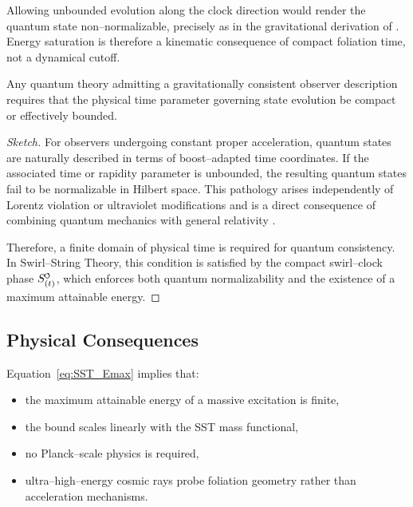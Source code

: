 \documentclass[11pt]{article}
\newcommand{\SwirlClock}{S_{(t)}^{\mkern-2mu\scriptscriptstyle\boldsymbol{\circlearrowleft}}}
\begin{document}
            Allowing unbounded evolution along the clock direction would render the quantum
            state non--normalizable, precisely as in the gravitational derivation of
            \cite{Makela2024QuantumGravity}. Energy saturation is therefore a kinematic
            consequence of compact foliation time, not a dynamical cutoff.

            \begin{theorem}
                \label{thm:time_boundedness}

                Any quantum theory admitting a gravitationally consistent observer description
                requires that the physical time parameter governing state evolution be compact
                or effectively bounded.

            \end{theorem}

            \begin{proof}[Sketch]
                For observers undergoing constant proper acceleration, quantum states are
                naturally described in terms of boost--adapted time coordinates.
                If the associated time or rapidity parameter is unbounded, the resulting
                quantum states fail to be normalizable in Hilbert space.
                This pathology arises independently of Lorentz violation or ultraviolet
                modifications and is a direct consequence of combining quantum mechanics with
                general relativity \cite{DiBiagio2021EmergentTime,Makela2024QuantumGravity}.

                Therefore, a finite domain of physical time is required for quantum
                consistency. In Swirl--String Theory, this condition is satisfied by the compact
                swirl--clock phase $\SwirlClock$, which enforces both quantum normalizability
                and the existence of a maximum attainable energy.
            \end{proof}

        \subsection{Physical Consequences}

            Equation~\eqref{eq:SST_Emax} implies that:
            \begin{itemize}
                \item the maximum attainable energy of a massive excitation is finite,
                \item the bound scales linearly with the SST mass functional,
                \item no Planck--scale physics is required,
                \item ultra--high--energy cosmic rays probe foliation geometry rather than
                acceleration mechanisms.
            \end{itemize}
\end{document}
